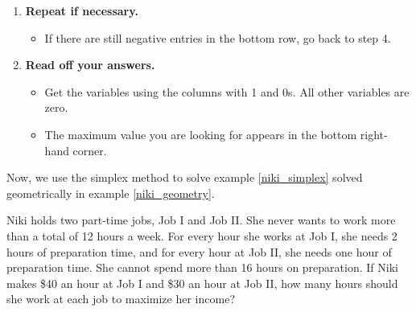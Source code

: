 \begin{summarybox}
\begin{enumerate}
        \item \textbf{Repeat if necessary.}
              \begin{itemize}
                  \item If there are still negative entries in the bottom row, go back to step 4.
              \end{itemize}

        \item \textbf{Read off your answers.}
              \begin{itemize}
                  \item Get the variables using the columns with 1 and 0s. All other variables are zero.
                  \item The maximum value you are looking for appears in the bottom right-hand corner.
              \end{itemize}
    \end{enumerate}
\end{summarybox}

Now, we use the simplex method to solve example \ref{niki_simplex} solved geometrically in example \ref{niki_geometry}.

\begin{example}\label{niki_simplex}
    Niki holds two part-time jobs, Job I and Job II. She never wants to work more than a total of 12 hours a week. For every hour she works at Job I, she needs 2 hours of preparation time, and for every hour at Job II, she needs one hour of preparation time. She cannot spend more than 16 hours on preparation. If Niki makes \$40 an hour at Job I and \$30 an hour at Job II, how many hours should she work at each job to maximize her income?
\end{example}

